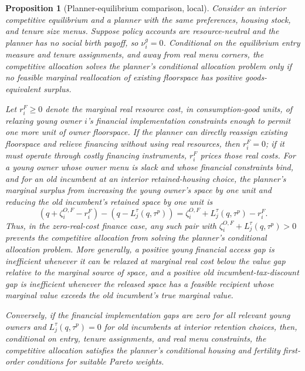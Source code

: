 \documentclass[11pt]{article}
\newtheorem{proposition}{Proposition}
\newcommand{\1}{\mathbf 1}
\begin{document}
\begin{proposition}[Planner-equilibrium comparison, local]
Consider an interior competitive equilibrium and a planner with the same preferences, housing stock, and tenure size menus. Suppose policy accounts are resource-neutral and the planner has no social birth payoff, so $\nu_i^g=0$. Conditional on the equilibrium entry measure and tenure assignments, and away from real menu corners, the competitive allocation solves the planner's conditional allocation problem only if no feasible marginal reallocation of existing floorspace has positive goods-equivalent surplus.

Let $r_i^F\ge0$ denote the marginal real resource cost, in consumption-good units, of relaxing young owner $i$'s financial implementation constraints enough to permit one more unit of owner floorspace. If the planner can directly reassign existing floorspace and relieve financing without using real resources, then $r_i^F=0$; if it must operate through costly financing instruments, $r_i^F$ prices those real costs. For a young owner whose owner menu is slack and whose financial constraints bind, and for an old incumbent at an interior retained-housing choice, the planner's marginal surplus from increasing the young owner's space by one unit and reducing the old incumbent's retained space by one unit is
\[
\left(q+\zeta_i^{O,F}-r_i^F\right)
-
\left(q-L_j^\tau(q,\tau^p)\right)
=
\zeta_i^{O,F}+L_j^\tau(q,\tau^p)-r_i^F.
\]
Thus, in the zero-real-cost finance case, any such pair with $\zeta_i^{O,F}+L_j^\tau(q,\tau^p)>0$ prevents the competitive allocation from solving the planner's conditional allocation problem. More generally, a positive young financial access gap is inefficient whenever it can be relaxed at marginal real cost below the value gap relative to the marginal source of space, and a positive old incumbent-tax-discount gap is inefficient whenever the released space has a feasible recipient whose marginal value exceeds the old incumbent's true marginal value.

Conversely, if the financial implementation gaps are zero for all relevant young owners and $L_j^\tau(q,\tau^p)=0$ for old incumbents at interior retention choices, then, conditional on entry, tenure assignments, and real menu constraints, the competitive allocation satisfies the planner's conditional housing and fertility first-order conditions for suitable Pareto weights.
\end{proposition}
\end{document}
